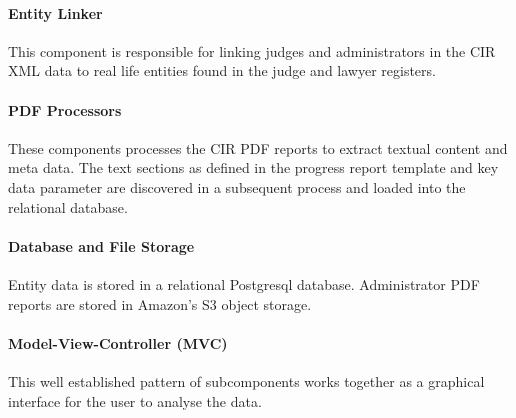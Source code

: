 \paragraph{Entity Linker} This component is responsible for linking judges and administrators in the CIR XML data to real life entities found in the judge and lawyer registers. 

\paragraph{PDF Processors}
These components processes the CIR PDF reports to extract textual content and meta data. The text sections as defined in the progress report template and key data parameter are discovered in a subsequent process and loaded into the relational database.

\paragraph{Database and File Storage}
Entity data is stored in a relational Postgresql database. Administrator PDF reports are stored in Amazon's S3 object storage.

\paragraph{Model-View-Controller (MVC)}
This well established pattern of subcomponents works together as a graphical interface for the user to analyse the data. 
